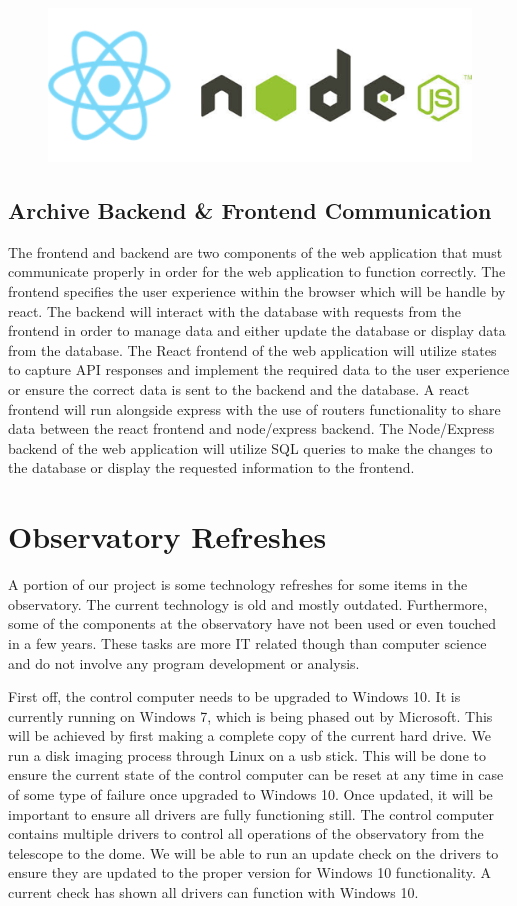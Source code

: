 \documentclass[12pt]{report}
\begin{document}
\begin{enumerate}
\begin{figure}[h]
	\centering
	\includegraphics[width=0.251\linewidth]{react_node}
\end{figure}

\subsection*{Archive Backend \& Frontend Communication}

The frontend and backend are two components of the web application that must communicate properly in order for the web application to function correctly.  The frontend specifies the user experience within the browser which will be handle by react.  The backend will interact with the database with requests from the frontend in order to manage data and either update the database or display data from the database.
The React frontend of the web application will utilize states to capture API responses and implement the required data to the user experience or ensure the correct data is sent to the backend and the database.  A react frontend will run alongside express with the use of routers functionality to share data between the react frontend and node/express backend.
The Node/Express backend of the web application will utilize SQL queries to make the changes to the database or display the requested information to the frontend.

\section*{Observatory Refreshes}

A portion of our project is some technology refreshes for some items in the observatory. The current technology is old and mostly outdated. Furthermore, some of the components at the observatory have not been used or even touched in a few years. These tasks are more IT related though than computer science and do not involve any program development or analysis.

First off, the control computer needs to be upgraded to Windows 10. It is currently running on Windows 7, which is being phased out by Microsoft. This will be achieved by first making a complete copy of the current hard drive. We run a disk imaging process through Linux on a usb stick. This will be done to ensure the current state of the control computer can be reset at any time in case of some type of failure once upgraded to Windows 10. Once updated, it will be important to ensure all drivers are fully functioning still. The control computer contains multiple drivers to control all operations of the observatory from the telescope to the dome. We will be able to run an update check on the drivers to ensure they are updated to the proper version for Windows 10 functionality. A current check has shown all drivers can function with Windows 10.


\end{enumerate}
\end{document}
